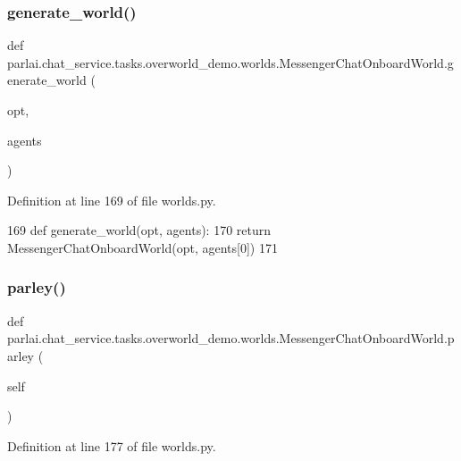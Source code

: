 \subsubsection{\texorpdfstring{generate\+\_\+world()}{generate\_world()}}
{\footnotesize\ttfamily def parlai.\+chat\+\_\+service.\+tasks.\+overworld\+\_\+demo.\+worlds.\+Messenger\+Chat\+Onboard\+World.\+generate\+\_\+world (\begin{DoxyParamCaption}\item[{}]{opt,  }\item[{}]{agents }\end{DoxyParamCaption})\hspace{0.3cm}{\ttfamily [static]}}



Definition at line 169 of file worlds.\+py.


\begin{DoxyCode}
169     \textcolor{keyword}{def }generate\_world(opt, agents):
170         \textcolor{keywordflow}{return} MessengerChatOnboardWorld(opt, agents[0])
171 
\end{DoxyCode}
\mbox{\label{classparlai_1_1chat__service_1_1tasks_1_1overworld__demo_1_1worlds_1_1MessengerChatOnboardWorld_adcb17035083c1d5060c276c8bd00df96}} 
\subsubsection{\texorpdfstring{parley()}{parley()}}
{\footnotesize\ttfamily def parlai.\+chat\+\_\+service.\+tasks.\+overworld\+\_\+demo.\+worlds.\+Messenger\+Chat\+Onboard\+World.\+parley (\begin{DoxyParamCaption}\item[{}]{self }\end{DoxyParamCaption})}



Definition at line 177 of file worlds.\+py.


